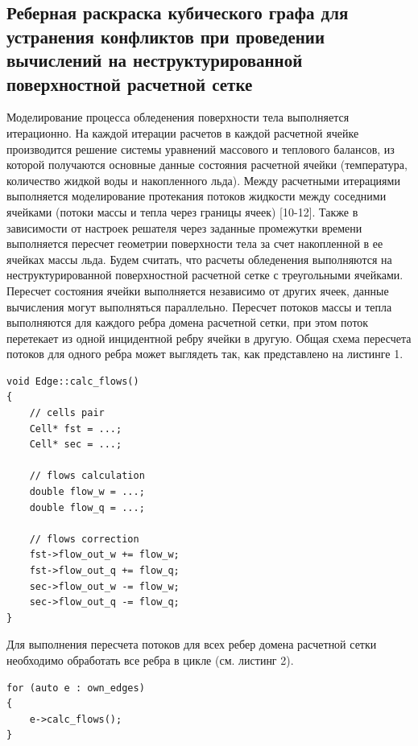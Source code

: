 \subsection{Реберная раскраска кубического графа для устранения конфликтов при проведении вычислений на неструктурированной поверхностной расчетной сетке}

Моделирование процесса обледенения поверхности тела выполняется итерационно.
На каждой итерации расчетов в каждой расчетной ячейке производится решение системы уравнений массового и теплового балансов, из которой получаются основные данные состояния расчетной ячейки (температура, количество жидкой воды и накопленного льда).
Между расчетными итерациями выполняется моделирование протекания потоков жидкости между соседними ячейками (потоки массы и тепла через границы ячеек) [10-12].
Также в зависимости от настроек решателя через заданные промежутки времени выполняется пересчет геометрии поверхности тела за счет накопленной в ее ячейках массы льда.
Будем считать, что расчеты обледенения выполняются на неструктурированной поверхностной расчетной сетке с треугольными ячейками.
Пересчет состояния ячейки выполняется независимо от других ячеек, данные вычисления могут выполняться параллельно.
Пересчет потоков массы и тепла выполняются для каждого ребра домена расчетной сетки, при этом поток перетекает из одной инцидентной ребру ячейки в другую.
Общая схема пересчета потоков для одного ребра может выглядеть так, как представлено на листинге 1.

\begin{lstlisting}[caption={caption}, label={label}]
void Edge::calc_flows()
{
    // cells pair
    Cell* fst = ...;
    Cell* sec = ...;

    // flows calculation
    double flow_w = ...;
    double flow_q = ...;

    // flows correction
    fst->flow_out_w += flow_w;
    fst->flow_out_q += flow_q;
    sec->flow_out_w -= flow_w;
    sec->flow_out_q -= flow_q;
}
\end{lstlisting}

Для выполнения пересчета потоков для всех ребер домена расчетной сетки необходимо обработать все ребра в цикле (см. листинг 2).

\begin{lstlisting}[caption={caption}, label={label}]
for (auto e : own_edges)
{
    e->calc_flows();
}
\end{lstlisting}

